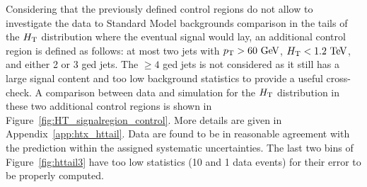 

Considering that the previously defined control regions do not allow
to investigate the data to Standard Model backgrounds comparison in
the tails of the $\HT$ distribution where the eventual signal would lay,
an additional control region is defined as follows: 
at most two jets with $\pt>60\gev$, $\HT<1.2\tev$, and either 2 or 3 \btag ged jets.
The  $\geq 4$ \btag ged jets is not considered as it still has 
a large signal content and too low background statistics to provide
a useful cross-check.
A comparison between data and simulation for the $\HT$ distribution 
in these two additional control regions is shown in 
Figure~\ref{fig:HT_signalregion_control}. More details are given 
in Appendix~\ref{app:htx_httail}.
Data are found to be in reasonable agreement with the 
prediction within the assigned systematic uncertainties. 
The last two bins of Figure~\ref{fig:httail3} have too low
statistics (10 and 1 data events) for their error to be properly computed.

